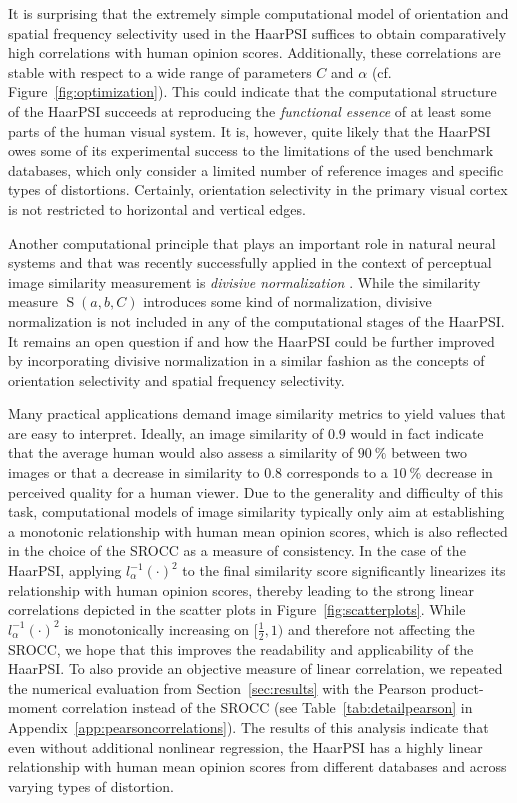 \documentclass[11pt,a4paper]{article}
\newcommand{\Sim}{\operatorname{S}}
\begin{document}
{It is surprising that the extremely simple computational model of orientation and spatial frequency selectivity used in the HaarPSI suffices to obtain comparatively high correlations with human opinion scores. Additionally, these correlations are stable with respect to a wide range of parameters $C$ and $\alpha$ (cf. Figure~\ref{fig:optimization}). This could indicate that the computational structure of the HaarPSI succeeds at reproducing the \textit{functional essence} of at least some parts of the human visual system. It is, however, quite likely that the HaarPSI owes some of its experimental success to the limitations of the used benchmark databases, which only consider a limited number of reference images and specific types of distortions. Certainly, orientation selectivity in the primary visual cortex is not restricted to horizontal and vertical edges.}

{Another computational principle that plays an important role in natural neural systems and that was recently successfully applied in the context of perceptual image similarity measurement is \textit{divisive normalization} \cite{laparra2017perceptually}. While the similarity measure $\Sim(a,b,C)$ introduces some kind of normalization, divisive normalization is not included in any of the computational stages of the HaarPSI. It remains an open question if and how the HaarPSI could be further improved by incorporating divisive normalization in a similar fashion as the concepts of orientation selectivity and spatial frequency selectivity.}

Many practical applications demand image similarity metrics to yield values that are easy to interpret. Ideally, an image similarity of $0.9$ would in fact indicate that the average human would also assess a similarity of $\SI{90}{\%}$ between two images or that a decrease in similarity to $0.8$ corresponds to a $\SI{10}{\%}$ decrease in perceived quality for a human viewer. Due to the generality and difficulty of this task, computational models of image similarity typically only aim at establishing a monotonic relationship with human mean opinion scores, which is also reflected in the choice of the SROCC as a measure of consistency. In the case of the HaarPSI, applying $l_\alpha^{-1}(\cdot)^2$ to the final similarity score significantly linearizes its relationship with human opinion scores, thereby leading to the strong linear correlations depicted in the scatter plots in Figure~\ref{fig:scatterplots}. While $l_\alpha^{-1}(\cdot)^2$ is monotonically increasing on $[\frac{1}{2},1)$ and therefore not affecting the SROCC, we hope that this improves the readability and applicability of the HaarPSI. To also provide an objective measure of linear correlation, we repeated the numerical evaluation from Section~\ref{sec:results} with the Pearson product-moment correlation instead of the SROCC (see Table~\ref{tab:detailpearson} in Appendix~\ref{app:pearsoncorrelations}). The results of this analysis indicate that even without additional nonlinear regression, the HaarPSI has a highly linear relationship with human mean opinion scores from different databases and across varying types of distortion. 
\end{document}
